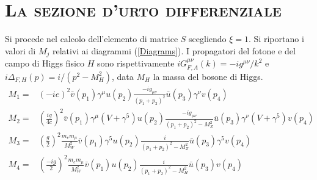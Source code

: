 \documentclass[11pt]{article}
\begin{document}
    \section{\centering\textsc{La sezione d'urto differenziale} } %
    Si procede nel calcolo dell'elemento di matrice $S$ scegliendo $\xi=1$. Si riportano i valori di $M_j$ relativi ai diagrammi (\ref{Diagrams}). I propagatori del fotone e del campo di Higgs fisico $H$ sono rispettivamente
    $iG_{F,A}^{\mu\nu}(k)=-ig^{\mu\nu}/k^2$ e $i\Delta_{F,H}(p)=i/(p^2-M_H^2)$, data $M_H$ la massa del bosone di Higgs.
    \begin{align}
    M_1=&\left(-ie\right)^2\bar{v}(p_1)\gamma^\mu u(p_2)\frac{-ig_{\mu\nu}}{(p_1+p_2)^2}\bar{u}(p_3)\gamma^\nu v(p_4)\label{M1}\\
    M_2=&\left(\frac{ig}{4c}\right)^2\bar{v}(p_1)\gamma^\mu(V+\gamma^5) u(p_2)\frac{-ig_{\mu\nu}}{(p_1+p_2)^2-M_Z^2}\bar{u}(p_3)\gamma^\nu(V+\gamma^5) v(p_4)\label{M2}\\
    M_3=&\left(\frac{g}{2}\right)^2\frac{m_em_\mu}{M_W^2}\bar{v}(p_1)\gamma^5u(p_2)\frac{i}{(p_1+p_2)^2-M_Z^2}\bar{u}(p_3)\gamma^5v(p_4)\label{M3}\\
    M_4=&\left(\frac{-ig}{2}\right)^2\frac{m_em_\mu}{M_W^2}\bar{v}(p_1)u(p_2)\frac{i}{(p_1+p_2)^2-M_H^2}\bar{u}(p_3)v(p_4)\label{M4}
    \end{align}
\end{document}
